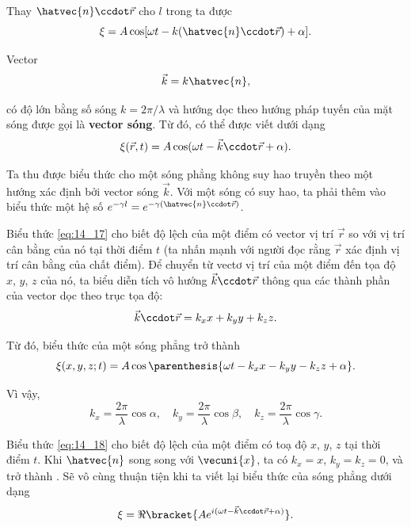 \noindent

Thay $\hatvec{n}\ccdot\vec{r}$ cho $l$ trong  ta được
\begin{equation}\label{eq:14_15}
    \xi = A \cos[\omega t - k (\hatvec{n}\ccdot\vec{r}) + \alpha].
\end{equation}

Vector
\begin{equation}\label{eq:14_16}
    \vec{k} = k \hatvec{n},
\end{equation}

\noindent
có độ lớn bằng số sóng $k=2\pi/\lambda$ và hướng dọc theo hướng pháp tuyến của mặt sóng được gọi là \textbf{vector sóng}. Từ đó,  có thể được viết dưới dạng
\begin{equation}\label{eq:14_17}
    \xi(\vec{r},t) = A \cos(\omega t - \vec{k} \ccdot \vec{r} + \alpha).
\end{equation}

\noindent
Ta thu được biểu thức cho một sóng phẳng không suy hao truyền theo một hướng xác định bởi vector sóng $\vec{k}$. Với một sóng có suy hao, ta phải thêm vào biểu thức một hệ số  $e^{-\gamma l}=e^{-\gamma (\hatvec{n}\ccdot\vec{r})}$.

Biểu thức \eqref{eq:14_17} cho biết độ lệch của một điểm có vector vị trí $\vec{r}$ so với vị trí cân bằng của nó tại thời điểm $t$ (ta nhấn mạnh với người đọc rằng $\vec{r}$ xác định vị trí cân bằng của chất điểm). Để chuyển từ vectơ vị trí của một điểm đến tọa độ $x$, $y$, $z$ của nó, ta biểu diễn tích vô hướng $\vec{k} \ccdot \vec{r}$ thông qua các thành phần của vector dọc theo trục tọa độ:
\begin{equation*}
    \vec{k}\ccdot\vec{r} = k_x x + k_y y + k_z z.
\end{equation*}

\noindent
Từ đó, biểu thức của một sóng phẳng trở thành
\begin{equation}\label{eq:14_18}
    \xi(x,y,z; t) = A \cos\parenthesis{ \omega t - k_x x - k_y y - k_z z + \alpha}.
\end{equation}

\noindent
Vì vậy,
\begin{equation}\label{eq:14_19}
    k_x = \frac{2\pi}{\lambda}\cos\alpha,\quad k_y = \frac{2\pi}{\lambda}\cos\beta, \quad k_z = \frac{2\pi}{\lambda}\cos\gamma.
\end{equation}

\noindent
Biểu thức \eqref{eq:14_18} cho biết độ lệch của một điểm có toạ độ $x$, $y$, $z$ tại thời điểm $t$. Khi $\hatvec{n}$ song song với $\vecuni{x}$, ta có $k_x = x$, $k_y = k_z = 0$, và  trở thành . Sẽ vô cùng thuận tiện khi ta viết lại biểu thức của sóng phẳng dưới dạng
\begin{equation}\label{eq:14_20}
    \xi = \Re\bracket{ A e^{i(\omega t - \vec{k}\ccdot\vec{r} + \alpha)} }.
\end{equation}


